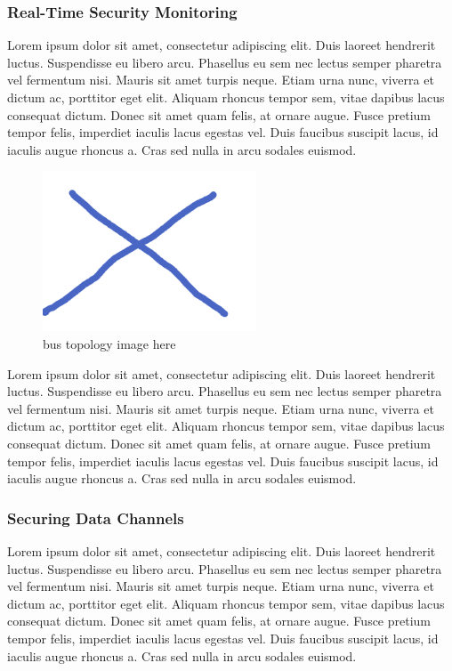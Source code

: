 \documentclass[final,conference,11pt]{IEEEtran}
\begin{document}
\subsubsection{Real-Time Security Monitoring}
Lorem ipsum dolor sit amet, consectetur adipiscing elit. Duis laoreet hendrerit luctus. Suspendisse eu libero arcu. Phasellus eu sem nec lectus semper pharetra vel fermentum nisi. Mauris sit amet turpis neque. Etiam urna nunc, viverra et dictum ac, porttitor eget elit. Aliquam rhoncus tempor sem, vitae dapibus lacus consequat dictum. Donec sit amet quam felis, at ornare augue. Fusce pretium tempor felis, imperdiet iaculis lacus egestas vel. Duis faucibus suscipit lacus, id iaculis augue rhoncus a. Cras sed nulla in arcu sodales euismod.

\begin{figure}[!t]
\centering
\includegraphics[width=2.5in]{topology}
\caption{bus topology image here}
\label{fig:monitor}
\end{figure}

Lorem ipsum dolor sit amet, consectetur adipiscing elit. Duis laoreet hendrerit luctus. Suspendisse eu libero arcu. Phasellus eu sem nec lectus semper pharetra vel fermentum nisi. Mauris sit amet turpis neque. Etiam urna nunc, viverra et dictum ac, porttitor eget elit. Aliquam rhoncus tempor sem, vitae dapibus lacus consequat dictum. Donec sit amet quam felis, at ornare augue. Fusce pretium tempor felis, imperdiet iaculis lacus egestas vel. Duis faucibus suscipit lacus, id iaculis augue rhoncus a. Cras sed nulla in arcu sodales euismod.

\subsubsection{Securing Data Channels}
Lorem ipsum dolor sit amet, consectetur adipiscing elit. Duis laoreet hendrerit luctus. Suspendisse eu libero arcu. Phasellus eu sem nec lectus semper pharetra vel fermentum nisi. Mauris sit amet turpis neque. Etiam urna nunc, viverra et dictum ac, porttitor eget elit. Aliquam rhoncus tempor sem, vitae dapibus lacus consequat dictum. Donec sit amet quam felis, at ornare augue. Fusce pretium tempor felis, imperdiet iaculis lacus egestas vel. Duis faucibus suscipit lacus, id iaculis augue rhoncus a. Cras sed nulla in arcu sodales euismod.
\end{document}
